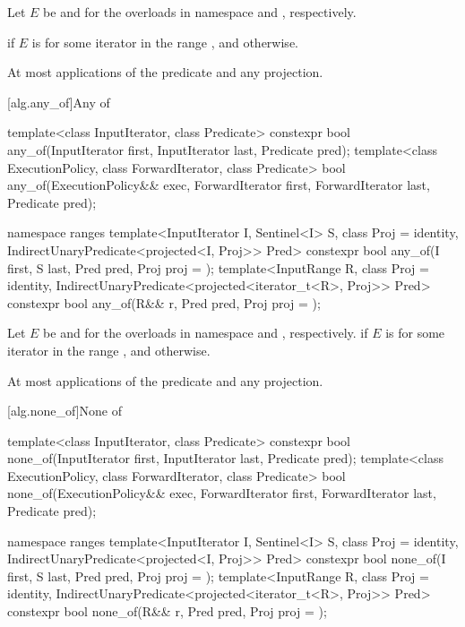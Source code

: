 \begin{itemdescr}
\pnum
Let $E$ be  and 
for the overloads in namespace  and , respectively.

\pnum
\returns
{} if $E$ is  for some iterator  in the
range , and  otherwise.

\pnum
\complexity At most  applications of the predicate
and any projection.
\end{itemdescr}

[alg.any_of]{Any of}

%
\begin{itemdecl}
template<class InputIterator, class Predicate>
  constexpr bool any_of(InputIterator first, InputIterator last, Predicate pred);
template<class ExecutionPolicy, class ForwardIterator, class Predicate>
  bool any_of(ExecutionPolicy&& exec, ForwardIterator first, ForwardIterator last,
              Predicate pred);

namespace ranges {
  template<InputIterator I, Sentinel<I> S, class Proj = identity,
      IndirectUnaryPredicate<projected<I, Proj>> Pred>
    constexpr bool any_of(I first, S last, Pred pred, Proj proj = {});
  template<InputRange R, class Proj = identity,
      IndirectUnaryPredicate<projected<iterator_t<R>, Proj>> Pred>
    constexpr bool any_of(R&& r, Pred pred, Proj proj = {});
}
\end{itemdecl}

\begin{itemdescr}
\pnum
Let $E$ be  and 
for the overloads in namespace  and , respectively.
\pnum
\returns
{} if $E$ is  for some iterator 
in the range , and  otherwise.

\pnum
\complexity At most  applications of the predicate
and any projection.
\end{itemdescr}

[alg.none_of]{None of}

%
\begin{itemdecl}
template<class InputIterator, class Predicate>
  constexpr bool none_of(InputIterator first, InputIterator last, Predicate pred);
template<class ExecutionPolicy, class ForwardIterator, class Predicate>
  bool none_of(ExecutionPolicy&& exec, ForwardIterator first, ForwardIterator last,
               Predicate pred);

namespace ranges {
  template<InputIterator I, Sentinel<I> S, class Proj = identity,
      IndirectUnaryPredicate<projected<I, Proj>> Pred>
    constexpr bool none_of(I first, S last, Pred pred, Proj proj = {});
  template<InputRange R, class Proj = identity,
      IndirectUnaryPredicate<projected<iterator_t<R>, Proj>> Pred>
    constexpr bool none_of(R&& r, Pred pred, Proj proj = {});
}
\end{itemdecl}

